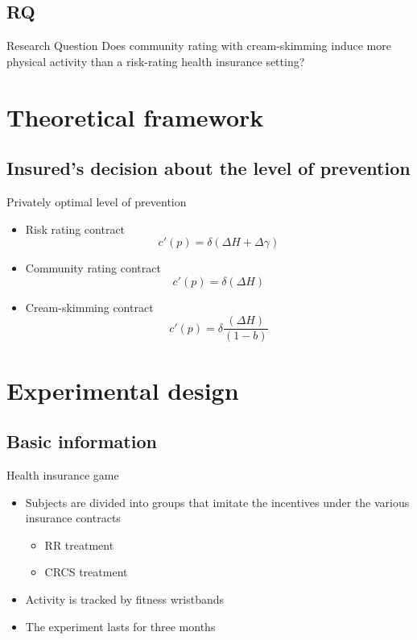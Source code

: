 \documentclass{beamer}
\begin{document}
\subsection{RQ}
\begin{frame}{Research Question}
	Does community rating with cream-skimming induce more physical activity than a risk-rating health insurance setting?
\end{frame}
\section{Theoretical framework}
\subsection{Insured's decision about the level of prevention}
\begin{frame}{Privately optimal level of prevention}
	\begin{itemize} 
			\item Risk rating contract
			$$c'(p)=\delta(\Delta{H}+\Delta\gamma)$$  
			\item Community rating contract
			$$c'(p)=\delta(\Delta{H})$$
			\item Cream-skimming contract
			$$c'(p)=\delta\frac{(\Delta{H})}{(1-b)}$$
	\end{itemize}
\end{frame}
\section{Experimental design}
\subsection{Basic information}
\begin{frame}{Health insurance game}
	\begin{itemize} 
		\item Subjects are divided into groups that imitate the incentives under the various insurance contracts 
		\begin{itemize} 
			\item RR treatment 
			\item CRCS treatment
		\end{itemize}
		\item Activity is tracked by fitness wristbands  
		\item The experiment lasts for three months
	\end{itemize}
\end{frame}
\end{document}
